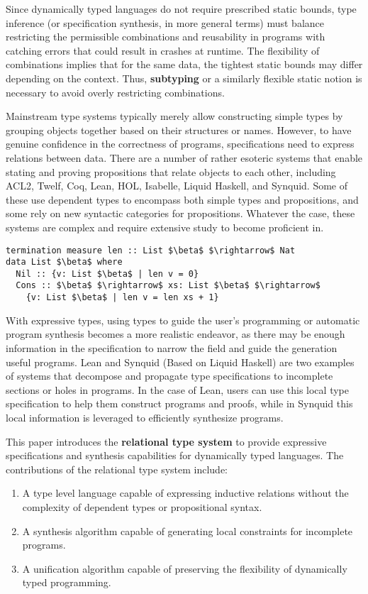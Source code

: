 \documentclass[sigplan,screen]{acmart}
\begin{document}
Since dynamically typed languages do not require prescribed static bounds, 
type inference (or specification synthesis, in more general terms) must balance 
restricting the permissible combinations and reusability in programs with 
catching errors that could result in crashes at runtime.
The flexibility of combinations implies that for the same data, 
the tightest static bounds may differ depending on the context.
Thus, \textbf{subtyping} or a similarly flexible 
static notion is necessary to avoid overly restricting combinations.

Mainstream type systems typically merely allow constructing simple types 
by grouping objects together based on their structures or names.
However, to have genuine confidence in the correctness of programs, specifications
need to express relations between data. There are a number of rather esoteric systems that
enable stating and proving propositions that relate objects to each other, 
including ACL2, Twelf, Coq, Lean, HOL, Isabelle, Liquid Haskell, and Synquid.  
Some of these use dependent types to encompass both simple types and propositions, 
and some rely on new syntactic categories for propositions. 
Whatever the case, these systems are complex and require extensive study to become proficient in.

\begin{lstlisting}[keywords={termination, measure, data, where}]
termination measure len :: List $\beta$ $\rightarrow$ Nat 
data List $\beta$ where
  Nil :: {v: List $\beta$ | len v = 0}
  Cons :: $\beta$ $\rightarrow$ xs: List $\beta$ $\rightarrow$ 
    {v: List $\beta$ | len v = len xs + 1}

\end{lstlisting}

With expressive types, using types to guide the user's programming or automatic program synthesis 
becomes a more realistic endeavor, as there may be enough information in the specification to narrow the field
and guide the generation useful programs. Lean and Synquid\cite{} (Based on Liquid Haskell) 
are two examples of systems that decompose and propagate type specifications 
to incomplete sections or holes in programs. 
In the case of Lean, users can use this local type specification to help them construct programs and proofs,
while in Synquid this local information is leveraged to efficiently synthesize programs. 

This paper introduces the \textbf{relational type system} to provide expressive specifications 
and synthesis capabilities for dynamically typed languages. 
The contributions of the relational type system include:
\begin{enumerate}
  \item A type level language capable of expressing inductive relations without the complexity of dependent types or propositional syntax.  
  \item A synthesis algorithm capable of generating local constraints for incomplete programs. 
  \item A unification algorithm capable of preserving the flexibility of dynamically typed programming. 
\end{enumerate}
\end{document}
